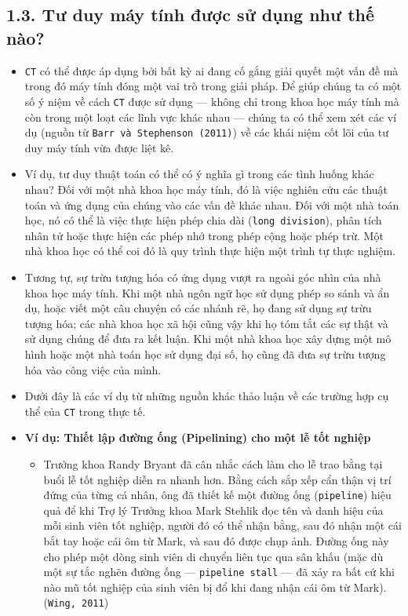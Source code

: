 \subsection*{1.3. Tư duy máy tính được sử dụng như thế nào?}
\begin{itemize}
    \item \texttt{CT} có thể được áp dụng bởi bất kỳ ai đang cố gắng giải quyết một vấn đề mà trong đó máy tính đóng một vai trò trong giải pháp. Để giúp chúng ta có một số ý niệm về cách \texttt{CT} được sử dụng — không chỉ trong khoa học máy tính mà còn trong một loạt các lĩnh vực khác nhau — chúng ta có thể xem xét các ví dụ (nguồn từ \texttt{Barr và Stephenson (2011)}) về các khái niệm cốt lõi của tư duy máy tính vừa được liệt kê.

    \item Ví dụ, tư duy thuật toán có thể có ý nghĩa gì trong các tình huống khác nhau? Đối với một nhà khoa học máy tính, đó là việc nghiên cứu các thuật toán và ứng dụng của chúng vào các vấn đề khác nhau. Đối với một nhà toán học, nó có thể là việc thực hiện phép chia dài (\verb|long division|), phân tích nhân tử hoặc thực hiện các phép nhớ trong phép cộng hoặc phép trừ. Một nhà khoa học có thể coi đó là quy trình thực hiện một trình tự thực nghiệm.

    \item Tương tự, sự trừu tượng hóa có ứng dụng vượt ra ngoài góc nhìn của nhà khoa học máy tính. Khi một nhà ngôn ngữ học sử dụng phép so sánh và ẩn dụ, hoặc viết một câu chuyện có các nhánh rẽ, họ đang sử dụng sự trừu tượng hóa; các nhà khoa học xã hội cũng vậy khi họ tóm tắt các sự thật và sử dụng chúng để đưa ra kết luận. Khi một nhà khoa học xây dựng một mô hình hoặc một nhà toán học sử dụng đại số, họ cũng đã đưa sự trừu tượng hóa vào công việc của mình.

    \item Dưới đây là các ví dụ từ những nguồn khác thảo luận về các trường hợp cụ thể của \texttt{CT} trong thực tế.

    \item \textbf{Ví dụ: Thiết lập đường ống (Pipelining) cho một lễ tốt nghiệp}
    \begin{itemize}
        \item Trưởng khoa Randy Bryant đã cân nhắc cách làm cho lễ trao bằng tại buổi lễ tốt nghiệp diễn ra nhanh hơn. Bằng cách sắp xếp cẩn thận vị trí đứng của từng cá nhân, ông đã thiết kế một đường ống (\verb|pipeline|) hiệu quả để khi Trợ lý Trưởng khoa Mark Stehlik đọc tên và danh hiệu của mỗi sinh viên tốt nghiệp, người đó có thể nhận bằng, sau đó nhận một cái bắt tay hoặc cái ôm từ Mark, và sau đó được chụp ảnh. Đường ống này cho phép một dòng sinh viên di chuyển liên tục qua sân khấu (mặc dù một sự tắc nghẽn đường ống — \verb|pipeline stall| — đã xảy ra bất cứ khi nào mũ tốt nghiệp của sinh viên bị đổ khi đang nhận cái ôm từ Mark). (\texttt{Wing, 2011})
    \end{itemize}


\end{itemize}
